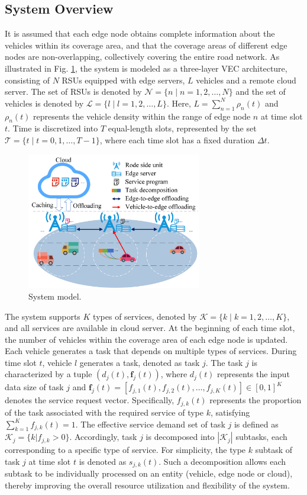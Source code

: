 \documentclass[lettersize,journal]{IEEEtran}
\begin{document}
\subsection{System Overview}
It is assumed that each edge node obtains complete information about the vehicles within its coverage area, and that the coverage areas of different edge nodes are non-overlapping, collectively covering the entire road network.
As illustrated in Fig. \ref{fig: system model}, the system is modeled  as a three-layer VEC architecture, consisting of $ N $ RSUs equipped with edge servers, $ L $ vehicles and a remote cloud server.
The set of RSUs is denoted by $ \mathcal{N} = \{ n \mid n= 1,2, \dots, N \} $ and 
the set of vehicles is denoted by $ \mathcal{L} = \{ l \mid l = 1, 2,\dots,L \} $.
Here, $ L=\sum_{n=1}^{N}{\rho_{n}(t)} $ and $ \rho_{n}(t) $ represents the vehicle density within the range of edge node $ n $ at time slot $ t $.
Time is discretized into $ T $ equal-length slots, represented by the set $ \mathcal{T}=\{t \mid t=0, 1,\dots, T-1\} $, where each time slot has a fixed duration $ \Delta t $.
\begin{figure}[!t]
	\centering
	\includegraphics[width=3in]{system model.png}
	\caption{System model.}
	\label{fig: system model}
\end{figure}
The system supports $ K $ types of services, denoted by $ \mathcal{K}=\{k \mid k=1,2,\dots,K \} $, and all services are available in cloud server.
At the beginning of each time slot, the number of vehicles within the coverage area of each edge node is updated. Each vehicle generates a task that depends on multiple types of services.
During time slot $ t $, vehicle $ l $ generates a task, denoted as task $ j $.
The task $ j $ is characterized by a tuple $( d_j(t), \mathbf{f}_j(t)) $, where $ d_j(t) $ represents the input data size of task $ j $ and $  \mathbf{f}_j(t)=[ f_{j,1}(t),f_{j,2}(t),\dots,f_{j,K}(t)] \in [0,1]^{K} $ denotes the service request vector.
Specifically, $ f_{j,k}(t) $ represents the proportion of the task associated with the required service of type $ k $, satisfying 
$ \sum_{k=1}^{K}{f_{j,k}(t)}=1 $.
The effective service demand set of task $ j $ is defined as $ \mathcal{K}_{j}=\{ k | f_{j,k}>0 \} $. 
Accordingly, task $ j $  is decomposed into $ |\mathcal{K}_{j}| $ subtasks, each corresponding to a specific type of service.
For simplicity, the type $ k $ subtask of task $ j $  at time slot $ t $  is denoted as $ s_{j,k}(t) $.
Such a decomposition allows each subtask to be individually processed on an entity (vehicle,  edge node or cloud), thereby improving the overall resource utilization and flexibility of the system.
\end{document}
